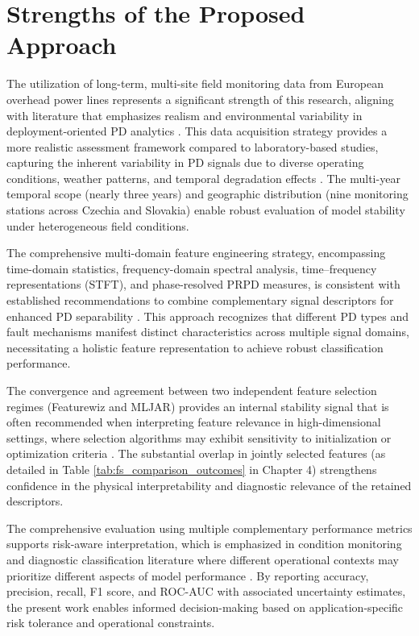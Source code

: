 \section{Strengths of the Proposed Approach}

The utilization of long-term, multi-site field monitoring data from European overhead power lines represents a significant strength of this research, aligning with literature that emphasizes realism and environmental variability in deployment-oriented PD analytics \parencite{Klein_2024_1, Sikorski_2025}. This data acquisition strategy provides a more realistic assessment framework compared to laboratory-based studies, capturing the inherent variability in PD signals due to diverse operating conditions, weather patterns, and temporal degradation effects \parencite{Orellana_2023_1, Florkowski_2024}. The multi-year temporal scope (nearly three years) and geographic distribution (nine monitoring stations across Czechia and Slovakia) enable robust evaluation of model stability under heterogeneous field conditions.

The comprehensive multi-domain feature engineering strategy, encompassing time-domain statistics, frequency-domain spectral analysis, time--frequency representations (STFT), and phase-resolved PRPD measures, is consistent with established recommendations to combine complementary signal descriptors for enhanced PD separability \parencite{Aldosari_2023, Long_2024}. This approach recognizes that different PD types and fault mechanisms manifest distinct characteristics across multiple signal domains, necessitating a holistic feature representation to achieve robust classification performance.

The convergence and agreement between two independent feature selection regimes (Featurewiz and MLJAR) provides an internal stability signal that is often recommended when interpreting feature relevance in high-dimensional settings, where selection algorithms may exhibit sensitivity to initialization or optimization criteria \parencite{Seitz_2024_1, Zhang_2024_28}. The substantial overlap in jointly selected features (as detailed in Table \ref{tab:fs_comparison_outcomes} in Chapter 4) strengthens confidence in the physical interpretability and diagnostic relevance of the retained descriptors.

The comprehensive evaluation using multiple complementary performance metrics supports risk-aware interpretation, which is emphasized in condition monitoring and diagnostic classification literature where different operational contexts may prioritize different aspects of model performance \parencite{Zemouri_2023_1, Adhikari_2024}. By reporting accuracy, precision, recall, F1 score, and ROC-AUC with associated uncertainty estimates, the present work enables informed decision-making based on application-specific risk tolerance and operational constraints.

